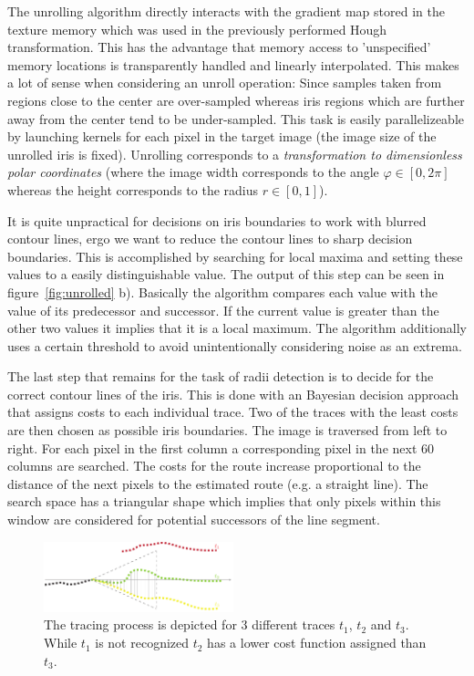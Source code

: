 \documentclass[journal]{IEEEtran}
\begin{document}
The unrolling algorithm directly interacts with the gradient map stored in the texture memory which was used in the previously performed Hough transformation. This has the advantage that memory access to 'unspecified' memory locations is transparently handled and linearly interpolated. This makes a lot of sense when considering an unroll operation: Since samples taken from regions close to the center are over-sampled whereas iris regions which are further away from the center tend to be under-sampled. This task is easily parallelizeable by launching kernels for each pixel in the target image (the image size of the unrolled iris is fixed). Unrolling corresponds to a \emph{transformation to dimensionless polar coordinates} (where the image width corresponds to the angle $\varphi \in [0, 2\pi]$ whereas the height corresponds to the radius $r \in [0, 1]$).
\par It is quite unpractical for decisions on iris boundaries to work with blurred contour lines, ergo we want to reduce the contour lines to sharp decision boundaries. This is accomplished by searching for local maxima and setting these values to a easily distinguishable value. The output of this step can be seen in figure~\ref{fig:unrolled} b). Basically the algorithm compares each value with the value of its predecessor and successor. If the current value is greater than the other two values it implies that it is a local maximum. The algorithm additionally uses a certain threshold to avoid unintentionally considering noise as an extrema. 
\par The last step that remains for the task of radii detection is to decide for the correct contour lines of the iris. This is done with an Bayesian decision approach that assigns costs to each individual trace. Two of the traces with the least costs are then chosen as possible iris boundaries. The image is traversed from left to right. For each pixel in the first column a corresponding pixel in the next 60 columns are searched. The costs for the route increase proportional to the distance of the next pixels to the estimated route (e.g. a straight line). The search space has a triangular shape which implies that only pixels within this window are considered for potential successors of the line segment.
\begin{figure}[ht]
	\centering
  \includegraphics[width=0.49\textwidth]{iris/trace}
	\caption{The tracing process is depicted for 3 different traces $t_1$, $t_2$ and $t_3$. While $t_1$ is not recognized $t_2$ has a lower cost function assigned than $t_3$.}
	\label{fig:trace}
\end{figure}
\end{document}
